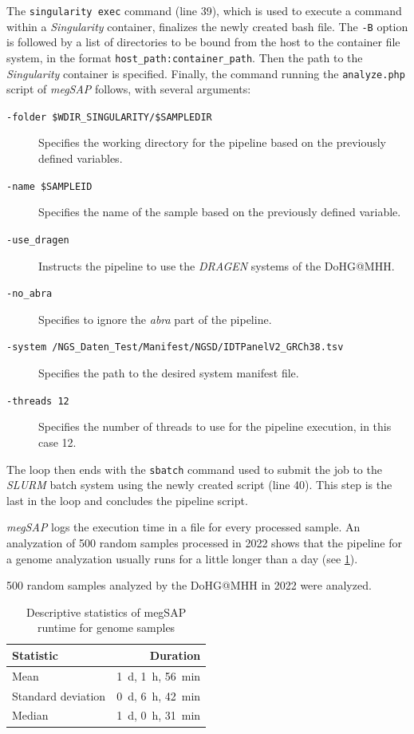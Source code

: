 The \lstinline{singularity exec} command (line \num{39}), which is used to execute a command within a \textit{Singularity} container, finalizes the newly created bash file. The \lstinline{-B} option is followed by a list of directories to be bound from the host to the container file system, in the format \lstinline{host_path:container_path}. Then the path to the \textit{Singularity} container is specified. Finally, the command running the \lstinline{analyze.php} script of \textit{\ac{megSAP}} follows, with several arguments:
\begin{description}
    \item[\texttt{-folder \$WDIR\_SINGULARITY/\$SAMPLEDIR}] Specifies the working directory for the pipeline based on the previously defined variables.
    \item[\texttt{-name \$SAMPLEID}] Specifies the name of the sample based on the previously defined variable.
    \item[\texttt{-use\_dragen}] Instructs the pipeline to use the \textit{DRAGEN} systems of the \ac{DoHG@MHH}.
    \item[\texttt{-no\_abra}] Specifies to ignore the \textit{abra} part of the pipeline.
    \item[\texttt{-system /NGS\_Daten\_Test/Manifest/NGSD/IDTPanelV2\_GRCh38.tsv}] Specifies the path to the desired system manifest file.
    \item[\texttt{-threads 12}] Specifies the number of threads to use for the pipeline execution, in this case 12.
\end{description}

The loop then ends with the \lstinline{sbatch} command used to submit the job to the \textit{\ac{SLURM}} batch system using the newly created script (line \num{40}). This step is the last in the loop and concludes the pipeline script.

\textit{\ac{megSAP}} logs the execution time in a file for every processed sample. An analyzation of \num{500} random samples processed in 2022 shows that the pipeline for a genome analyzation usually runs for a little longer than a day (see \cref{table:scriptruntimestats}).

\begin{table}[H]
\centering
\caption[Descriptive statistics of \acs{megSAP} runtime for genome samples]{Descriptive statistics of \acs{megSAP} runtime for genome samples}{\num{500} random samples analyzed by the \ac{DoHG@MHH} in 2022 were analyzed.\\\smallskip}
\label{table:scriptruntimestats}
\small
\begin{tabular}{lr}
\toprule
Statistic & Duration \\
\midrule
Mean & \SI{1}{\day}, \SI{1}{\hour}, \SI{56}{\minute} \\
Standard deviation & \SI{0}{\day}, \SI{6}{\hour}, \SI{42}{\minute} \\
Median & \SI{1}{\day}, \SI{0}{\hour}, \SI{31}{\minute} \\
\bottomrule
\end{tabular}
\end{table}

